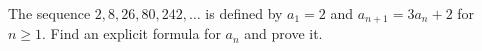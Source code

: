 The sequence $2,8,26,80,242,\dots$ is defined by $a_1=2$ and $a_{n+1}=3a_n+2$ for $n\ge1$. Find an explicit formula for $a_n$ and prove it.
